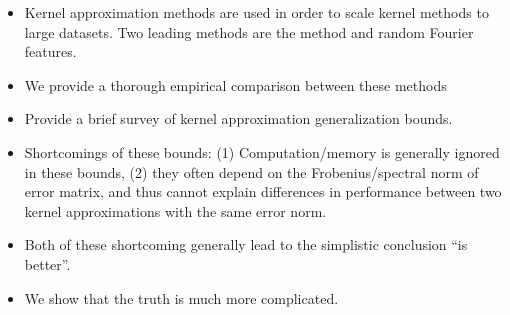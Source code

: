 


\begin{itemize}
	\item Kernel approximation methods are used in order to scale kernel methods to large datasets.  Two leading methods are the \Nystrom method and random Fourier features.
	\item We provide a thorough empirical comparison between these methods
	\item Provide a brief survey of kernel approximation generalization bounds.
	\item Shortcomings of these bounds: (1) Computation/memory is generally ignored in these bounds, (2) they often depend on the Frobenius/spectral norm of error matrix, and thus cannot explain differences in performance between two kernel approximations with the same error norm.
	\item Both of these shortcoming generally lead to the simplistic conclusion ``\Nystrom is better''.
	\item We show that the truth is much more complicated. 
\end{itemize}